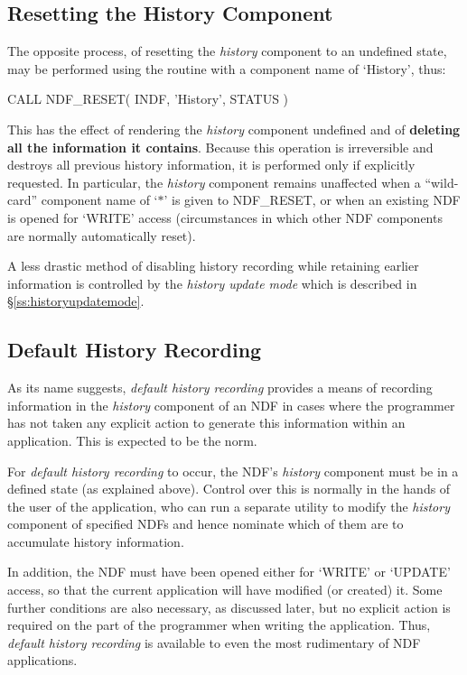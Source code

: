 \documentclass[twoside,11pt,nolof]{starlink}
\providecommand{\st}[1]{{\emph{#1}}}
\begin{document}
\subsection{\label{ss:resettinghistory}Resetting the History Component}

The opposite process, of resetting the \st{history\/} component to an
undefined state, may be performed using the  routine with a
component name of `History', thus:

\small
\begin{terminalv}
      CALL NDF_RESET( INDF, 'History', STATUS )
\end{terminalv}
\normalsize

This has the effect of rendering the \st{history\/} component undefined
and of \textbf{deleting all the information it contains}. Because this
operation is irreversible and destroys all previous history
information, it is performed only if explicitly requested. In
particular, the \st{history\/} component remains unaffected when a
``wild-card'' component name of `$*$' is given to NDF\_RESET, or when
an existing NDF is opened for `WRITE' access (circumstances in which
other NDF components are normally automatically reset).

A less drastic method of disabling history recording while retaining
earlier information is controlled by the \st{history update mode\/}
which is described in \S\ref{ss:historyupdatemode}.

\subsection{\label{ss:defaulthistory}Default History Recording}
As its name suggests, \st{default history recording\/} provides a means
of recording information in the \st{history\/} component of an NDF in
cases where the programmer has not taken any explicit action to
generate this information within an application. This is expected to
be the norm.

For \st{default history recording\/} to occur, the NDF's \st{history\/}
component must be in a defined state (as explained above). Control
over this is normally in the hands of the user of the application, who
can run a separate utility to modify the \st{history\/} component of
specified NDFs and hence nominate which of them are to accumulate
history information.

In addition, the NDF must have been opened either for `WRITE' or
`UPDATE' access, so that the current application will have modified
(or created) it. Some further conditions are also necessary, as
discussed later, but no explicit action is required on the part of the
programmer when writing the application. Thus, \st{default history
recording\/} is available to even the most rudimentary of NDF
applications.
\end{document}
